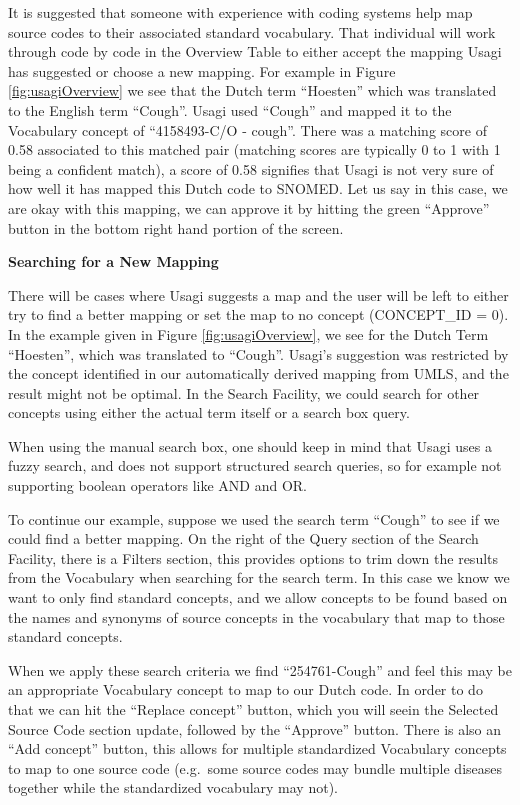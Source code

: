\documentclass[11pt]{book}
\theoremstyle{definition}
\theoremstyle{definition}
\theoremstyle{definition}
\theoremstyle{remark}
\begin{document}
It is suggested that someone with experience with coding systems help map source codes to their associated standard vocabulary. That individual will work through code by code in the Overview Table to either accept the mapping Usagi has suggested or choose a new mapping. For example in Figure \ref{fig:usagiOverview} we see that the Dutch term ``Hoesten'' which was translated to the English term ``Cough''. Usagi used ``Cough'' and mapped it to the Vocabulary concept of ``4158493-C/O - cough''. There was a matching score of 0.58 associated to this matched pair (matching scores are typically 0 to 1 with 1 being a confident match), a score of 0.58 signifies that Usagi is not very sure of how well it has mapped this Dutch code to SNOMED. Let us say in this case, we are okay with this mapping, we can approve it by hitting the green ``Approve'' button in the bottom right hand portion of the screen.

\textbf{Searching for a New Mapping}

There will be cases where Usagi suggests a map and the user will be left to either try to find a better mapping or set the map to no concept (CONCEPT\_ID = 0). In the example given in Figure \ref{fig:usagiOverview}, we see for the Dutch Term ``Hoesten'', which was translated to ``Cough''. Usagi's suggestion was restricted by the concept identified in our automatically derived mapping from UMLS, and the result might not be optimal. In the Search Facility, we could search for other concepts using either the actual term itself or a search box query.

When using the manual search box, one should keep in mind that Usagi uses a fuzzy search, and does not support structured search queries, so for example not supporting boolean operators like AND and OR.

To continue our example, suppose we used the search term ``Cough'' to see if we could find a better mapping. On the right of the Query section of the Search Facility, there is a Filters section, this provides options to trim down the results from the Vocabulary when searching for the search term. In this case we know we want to only find standard concepts, and we allow concepts to be found based on the names and synonyms of source concepts in the vocabulary that map to those standard concepts.

When we apply these search criteria we find ``254761-Cough'' and feel this may be an appropriate Vocabulary concept to map to our Dutch code. In order to do that we can hit the ``Replace concept'' button, which you will seein the Selected Source Code section update, followed by the ``Approve'' button. There is also an ``Add concept'' button, this allows for multiple standardized Vocabulary concepts to map to one source code (e.g.~some source codes may bundle multiple diseases together while the standardized vocabulary may not).
\end{document}
